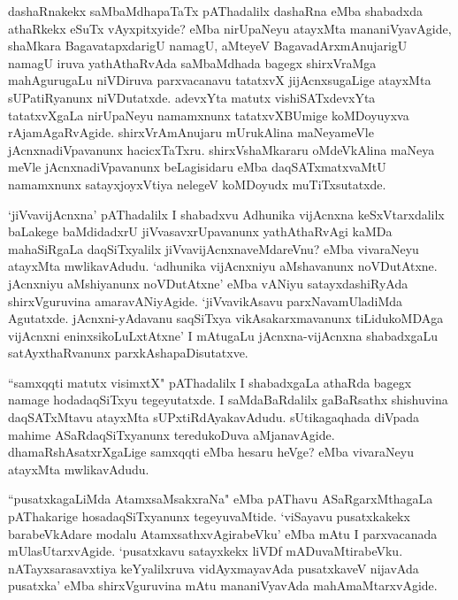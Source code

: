 dashaRnakekx  saMbaMdhapaTaTx pAThadalilx dashaRna eMba shabadxda athaRkekx eSuTx vAyxpitxyide? eMba nirUpaNeyu atayxMta mananiVyavAgide, shaMkara BagavatapxdarigU namagU, aMteyeV BagavadArxmAnujarigU namagU iruva yathAthaRvAda saMbaMdhada bagegx shirxVraMga mahAgurugaLu niVDiruva parxvacanavu tatatxvX jijAcnxsugaLige atayxMta sUPatiRyanunx niVDutatxde. adevxYta matutx vishiSATxdevxYta tatatxvXgaLa nirUpaNeyu namamxnunx tatatxvXBUmige koMDoyuyxva rAjamAgaRvAgide. shirxVrAmAnujaru mUrukAlina maNeyameVle jAcnxnadiVpavanunx hacicxTaTxru. shirxVshaMkararu oMdeVkAlina maNeya meVle jAcnxnadiVpavanunx beLagisidaru eMba daqSATxmatxvaMtU namamxnunx satayxjoyxVtiya nelegeV koMDoyudx muTiTxsutatxde.

`jiVvavijAcnxna' pAThadalilx I shabadxvu Adhunika vijAcnxna keSxVtarxdalilx baLakege baMdidadxrU jiVvasavxrUpavanunx yathAthaRvAgi kaMDa mahaSiRgaLa daqSiTxyalilx jiVvavijAcnxnaveMdareVnu? eMba vivaraNeyu atayxMta mwlikavAdudu. `adhunika vijAcnxniyu aMshavanunx noVDutAtxne. jAcnxniyu aMshiyanunx  noVDutAtxne' eMba vANiyu satayxdashiRyAda shirxVguruvina amaravANiyAgide. `jiVvavikAsavu parxNavamUladiMda Agutatxde. jAcnxni-yAdavanu saqSiTxya vikAsakarxmavanunx tiLidukoMDAga vijAcnxni eninxsikoLuLxtAtxne' I mAtugaLu jAcnxna-vijAcnxna shabadxgaLu satAyxthaRvanunx parxkAshapaDisutatxve.

``samxqqti matutx visimxtX" pAThadalilx I shabadxgaLa athaRda bagegx  namage hodadaqSiTxyu tegeyutatxde. I saMdaBaRdalilx gaBaRsathx shishuvina daqSATxMtavu atayxMta  sUPxtiRdAyakavAdudu. sUtikagaqhada diVpada mahime ASaRdaqSiTxyanunx teredukoDuva aMjanavAgide. dhamaRshAsatxrXgaLige samxqqti eMba hesaru heVge? eMba vivaraNeyu atayxMta mwlikavAdudu.

``pusatxkagaLiMda AtamxsaMsakxraNa" eMba pAThavu ASaRgarxMthagaLa pAThakarige hosadaqSiTxyanunx tegeyuvaMtide. `viSayavu pusatxkakekx  barabeVkAdare modalu AtamxsathxvAgirabeVku' eMba mAtu I parxvacanada mUlasUtarxvAgide. `pusatxkavu satayxkekx liVDf mADuvaMtirabeVku. nATayxsarasavxtiya keYyalilxruva vidAyxmayavAda pusatxkaveV nijavAda pusatxka' eMba shirxVguruvina mAtu mananiVyavAda mahAmaMtarxvAgide.

